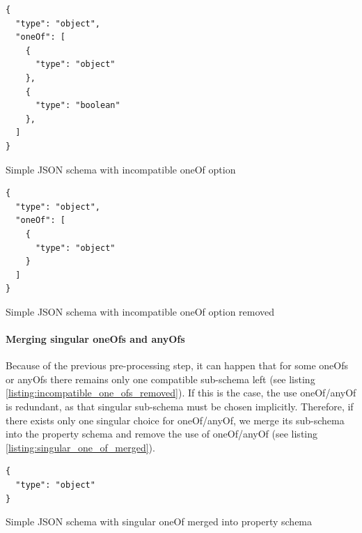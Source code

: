 \begin{listing}[!h]
    \begin{verbatim}
{
  "type": "object",
  "oneOf": [
    {
      "type": "object"
    },
    {
      "type": "boolean"
    },
  ]
}
    \end{verbatim}
    \caption{Simple JSON schema with incompatible oneOf option}
    \label{listing:incompatible_one_ofs}

\end{listing}


\begin{listing}[!h]
    \begin{verbatim}
{
  "type": "object",
  "oneOf": [
    {
      "type": "object"
    }
  ]
}
    \end{verbatim}
    \caption{Simple JSON schema with incompatible oneOf option removed}
    \label{listing:incompatible_one_ofs_removed}
\end{listing}


\paragraph{Merging singular oneOfs and anyOfs}
Because of the previous pre-processing step, it can happen that for some oneOfs or anyOfs there remains only one compatible sub-schema left (see listing \ref{listing:incompatible_one_ofs_removed}).
If this is the case, the use oneOf/anyOf is redundant, as that singular sub-schema must be chosen implicitly.
Therefore, if there exists only one singular choice for oneOf/anyOf, we merge its sub-schema into the property schema and remove the use of oneOf/anyOf (see listing \ref{listing:singular_one_of_merged}).

\begin{listing}[!h]
    \begin{verbatim}
{
  "type": "object"
}
    \end{verbatim}
    \caption{Simple JSON schema with singular oneOf merged into property schema}
    \label{listing:singular_one_of_merged}
\end{listing}



